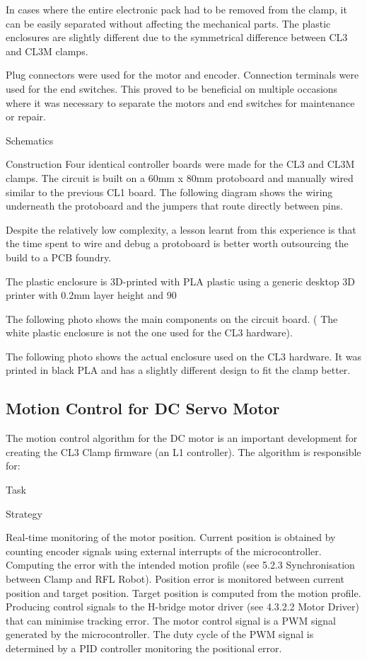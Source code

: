 In cases where the entire electronic pack had to be removed from the clamp, it can be easily separated without affecting the mechanical parts. The plastic enclosures are slightly different due to the symmetrical difference between CL3 and CL3M clamps. 

Plug connectors were used for the motor and encoder. Connection terminals were used for the end switches. This proved to be beneficial on multiple occasions where it was necessary to separate the motors and end switches for maintenance or repair.

Schematics

Construction
Four identical controller boards were made for the CL3 and CL3M clamps. The circuit is built on a 60mm x 80mm protoboard and manually wired similar to the previous CL1 board. The following diagram shows the wiring underneath the protoboard and the jumpers that route directly between pins.

Despite the relatively low complexity, a lesson learnt from this experience is that the time spent to wire and debug a protoboard is better worth outsourcing the build to a PCB foundry. 

The plastic enclosure is 3D-printed with PLA plastic using a generic desktop 3D printer with 0.2mm layer height and 90%

The following photo shows the main components on the circuit board. ( The white plastic enclosure is not the one used for the CL3 hardware). 

The following photo shows the actual enclosure used on the CL3 hardware. It was printed in black PLA and has a slightly different design to fit the clamp better.

\subsection{Motion Control for DC Servo Motor}
\label{subsection:exploration_2_motion_control_for_dc_servo_motor}

The motion control algorithm for the DC motor is an important development for creating the CL3 Clamp firmware (an L1 controller). The algorithm is responsible for:

Task

Strategy

Real-time monitoring of the motor position.
Current position is obtained by counting encoder signals using external interrupts of the microcontroller.
Computing the error with the intended motion profile (see 5.2.3 Synchronisation between Clamp and RFL Robot).
Position error is monitored between current position and target position. 
Target position is computed from the motion profile.
Producing control signals to the H-bridge motor driver (see 4.3.2.2 Motor Driver) that can minimise tracking error. 
The motor control signal is a PWM signal generated by the microcontroller. 
The duty cycle of the PWM signal is determined by a PID controller monitoring the positional error.

